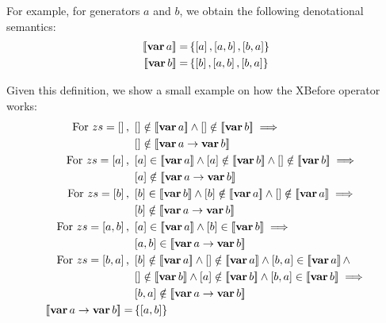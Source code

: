 For example, for generators $a$ and $b$, we obtain the following denotational semantics:
%
\begin{subequations}
\begin{align}
\denote{\var{a}} = & \left\{\listsin{a}, \listsin{a,b}, \listsin{b,a}\right\}\label{eq:denotational-var-a}\\
%
\denote{\var{b}} = & \left\{\listsin{b}, \listsin{a,b}, \listsin{b,a}\right\}\label{eq:denotational-var-b}
\end{align}
\end{subequations}

Given this definition, we show a small example on how the \ac{XBefore} operator works:
%
\begin{align}
\text{For } zs = \listsin{} \text{, } &
  \listsin{} \notin \denote{\var{a}} \land 
  \listsin{} \notin \denote{\var{b}} 
  \implies\nonumber\\
  & \listsin{} \notin \denote{\xbefore{\var{a}}{\var{b}}} \nonumber\\
\text{For } zs = \listsin{a} \text{, } &
  \listsin{a} \in \denote{\var{a}} \land 
  \listsin{a} \notin \denote{\var{b}} \land 
  \listsin{} \notin \denote{\var{b}} 
  \implies\nonumber\\
  & \listsin{a} \notin \denote{\xbefore{\var{a}}{\var{b}}} \nonumber\\
\text{For } zs = \listsin{b} \text{, } &
  \listsin{b} \in \denote{\var{b}} \land
  \listsin{b} \notin \denote{\var{a}} \land 
  \listsin{} \notin \denote{\var{a}} 
  \implies\nonumber\\
  & \listsin{b} \notin \denote{\xbefore{\var{a}}{\var{b}}} \nonumber\\
\text{For } zs = \listsin{a,b} \text{, } &
  \listsin{a} \in \denote{\var{a}} \land 
  \listsin{b} \in \denote{\var{b}} 
  \implies\nonumber\\
  & \listsin{a,b} \in \denote{\xbefore{\var{a}}{\var{b}}} \nonumber\\
\text{For } zs = \listsin{b,a} \text{, } &
  \listsin{b} \notin \denote{\var{a}} \land 
  \listsin{} \notin \denote{\var{a}} \land 
  \listsin{b,a} \in \denote{\var{a}} \land\nonumber\\
  & \listsin{} \notin \denote{\var{b}} \land 
  \listsin{a} \notin \denote{\var{b}} \land
  \listsin{b,a} \in \denote{\var{b}}
  \implies\nonumber\\
  & \listsin{b,a} \notin \denote{\xbefore{\var{a}}{\var{b}}} \nonumber\\
\denote{\xbefore{\var{a}}{\var{b}}} = & \left\{\listsin{a,b}\right\}
\end{align}

